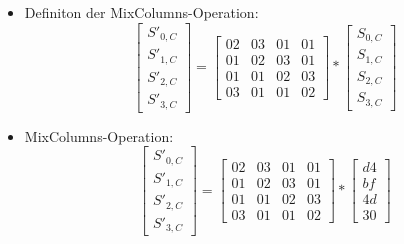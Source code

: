 \begin{itemize}
     \item Definiton der MixColumns-Operation:
     \begin{equation}
         \begin{bmatrix}
             S'_{0,C}\\
             S'_{1,C}\\
             S'_{2,C}\\
             S'_{3,C}
         \end{bmatrix}
         =
         \begin{bmatrix}
             02 & 03 & 01 & 01\\
             01 & 02 & 03 & 01\\
             01 & 01 & 02 & 03\\
             03 & 01 & 01 & 02
         \end{bmatrix}
         *
         \begin{bmatrix}
             S_{0,C}\\
             S_{1,C}\\
             S_{2,C}\\
             S_{3,C}
         \end{bmatrix}
     \end{equation}

     \item MixColumns-Operation:
     \begin{equation}
         \begin{bmatrix}
             S'_{0,C}\\
             S'_{1,C}\\
             S'_{2,C}\\
             S'_{3,C}
         \end{bmatrix}
         =
         \begin{bmatrix}
             02 & 03 & 01 & 01\\
             01 & 02 & 03 & 01\\
             01 & 01 & 02 & 03\\
             03 & 01 & 01 & 02
         \end{bmatrix}
         *
         \begin{bmatrix}
             d4\\
             bf\\
             4d\\
             30
         \end{bmatrix}
     \end{equation}


\end{itemize}
